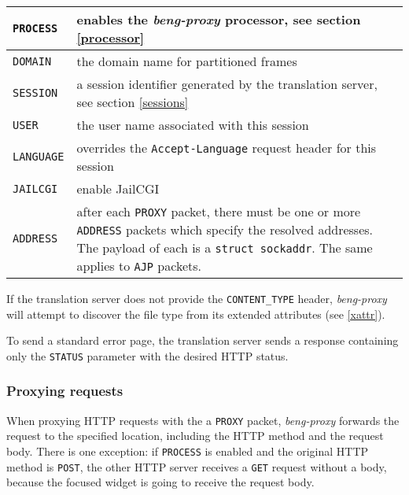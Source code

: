 \documentclass[a4paper,12pt]{article}
\begin{document}
\begin{tabular}{|l|p{10cm}|}
\hline

\texttt{PROCESS} & enables the \emph{beng-proxy} processor, see
section \ref{processor} \\

\hline

\texttt{DOMAIN} & the domain name for partitioned frames \\

\hline

\texttt{SESSION} & a session identifier generated by the translation
server, see section \ref{sessions} \\

\hline

\texttt{USER} & the user name associated with this session \\

\hline

\texttt{LANGUAGE} & overrides the \texttt{Accept-Language} request
header for this session \\
\hline

\texttt{JAILCGI} & enable JailCGI \\

\hline

\texttt{ADDRESS} & after each \texttt{PROXY} packet, there must be one
or more \texttt{ADDRESS} packets which specify the resolved addresses.
The payload of each is a \texttt{struct sockaddr}.
The same applies to \texttt{AJP} packets. \\

\hline
\end{tabular}

If the translation server does not provide the \texttt{CONTENT\_TYPE}
header, \emph{beng-proxy} will attempt to discover the file type from
its extended attributes (see \ref{xattr}).

To send a standard error page, the translation server sends a response
containing only the \texttt{STATUS} parameter with the desired HTTP
status.

\subsubsection{Proxying requests}

When proxying HTTP requests with the a \texttt{PROXY} packet,
\emph{beng-proxy} forwards the request to the specified location,
including the HTTP method and the request body.  There is one
exception: if \texttt{PROCESS} is enabled and the original HTTP method
is \texttt{POST}, the other HTTP server receives a \texttt{GET}
request without a body, because the focused widget is going to receive
the request body.
\end{document}
